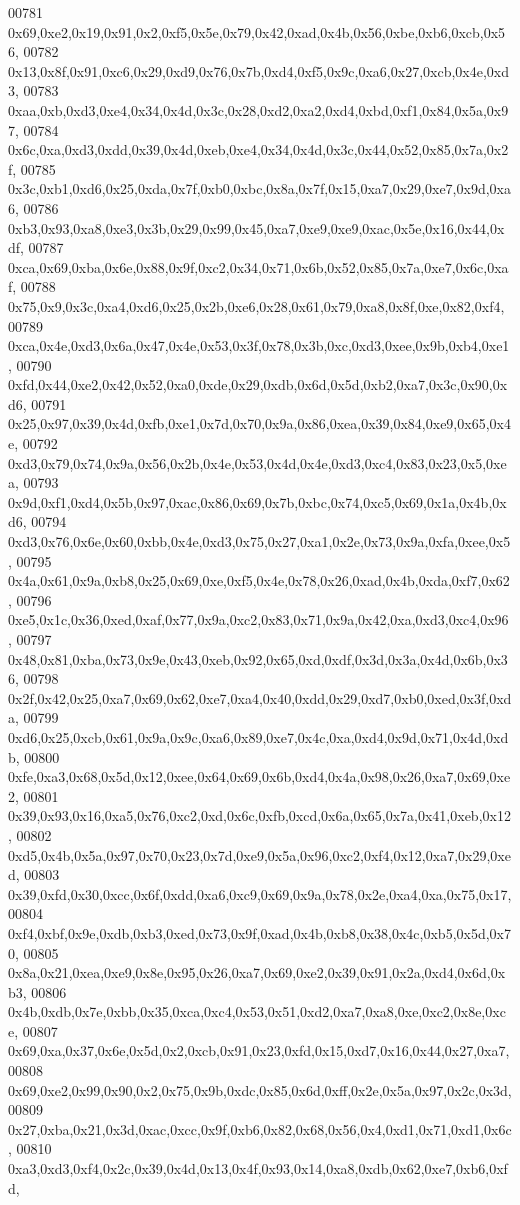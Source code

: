 \begin{DoxyCode}
00781   0x69,0xe2,0x19,0x91,0x2,0xf5,0x5e,0x79,0x42,0xad,0x4b,0x56,0xbe,0xb6,0xcb,0x56,
00782   0x13,0x8f,0x91,0xc6,0x29,0xd9,0x76,0x7b,0xd4,0xf5,0x9c,0xa6,0x27,0xcb,0x4e,0xd3,
00783   0xaa,0xb,0xd3,0xe4,0x34,0x4d,0x3c,0x28,0xd2,0xa2,0xd4,0xbd,0xf1,0x84,0x5a,0x97,
00784   0x6c,0xa,0xd3,0xdd,0x39,0x4d,0xeb,0xe4,0x34,0x4d,0x3c,0x44,0x52,0x85,0x7a,0x2f,
00785   0x3c,0xb1,0xd6,0x25,0xda,0x7f,0xb0,0xbc,0x8a,0x7f,0x15,0xa7,0x29,0xe7,0x9d,0xa6,
00786   0xb3,0x93,0xa8,0xe3,0x3b,0x29,0x99,0x45,0xa7,0xe9,0xe9,0xac,0x5e,0x16,0x44,0xdf,
00787   0xca,0x69,0xba,0x6e,0x88,0x9f,0xc2,0x34,0x71,0x6b,0x52,0x85,0x7a,0xe7,0x6c,0xaf,
00788   0x75,0x9,0x3c,0xa4,0xd6,0x25,0x2b,0xe6,0x28,0x61,0x79,0xa8,0x8f,0xe,0x82,0xf4,
00789   0xca,0x4e,0xd3,0x6a,0x47,0x4e,0x53,0x3f,0x78,0x3b,0xc,0xd3,0xee,0x9b,0xb4,0xe1,
00790   0xfd,0x44,0xe2,0x42,0x52,0xa0,0xde,0x29,0xdb,0x6d,0x5d,0xb2,0xa7,0x3c,0x90,0xd6,
00791   0x25,0x97,0x39,0x4d,0xfb,0xe1,0x7d,0x70,0x9a,0x86,0xea,0x39,0x84,0xe9,0x65,0x4e,
00792   0xd3,0x79,0x74,0x9a,0x56,0x2b,0x4e,0x53,0x4d,0x4e,0xd3,0xc4,0x83,0x23,0x5,0xea,
00793   0x9d,0xf1,0xd4,0x5b,0x97,0xac,0x86,0x69,0x7b,0xbc,0x74,0xc5,0x69,0x1a,0x4b,0xd6,
00794   0xd3,0x76,0x6e,0x60,0xbb,0x4e,0xd3,0x75,0x27,0xa1,0x2e,0x73,0x9a,0xfa,0xee,0x5,
00795   0x4a,0x61,0x9a,0xb8,0x25,0x69,0xe,0xf5,0x4e,0x78,0x26,0xad,0x4b,0xda,0xf7,0x62,
00796   0xe5,0x1c,0x36,0xed,0xaf,0x77,0x9a,0xc2,0x83,0x71,0x9a,0x42,0xa,0xd3,0xc4,0x96,
00797   0x48,0x81,0xba,0x73,0x9e,0x43,0xeb,0x92,0x65,0xd,0xdf,0x3d,0x3a,0x4d,0x6b,0x36,
00798   0x2f,0x42,0x25,0xa7,0x69,0x62,0xe7,0xa4,0x40,0xdd,0x29,0xd7,0xb0,0xed,0x3f,0xda,
00799   0xd6,0x25,0xcb,0x61,0x9a,0x9c,0xa6,0x89,0xe7,0x4c,0xa,0xd4,0x9d,0x71,0x4d,0xdb,
00800   0xfe,0xa3,0x68,0x5d,0x12,0xee,0x64,0x69,0x6b,0xd4,0x4a,0x98,0x26,0xa7,0x69,0xe2,
00801   0x39,0x93,0x16,0xa5,0x76,0xc2,0xd,0x6c,0xfb,0xcd,0x6a,0x65,0x7a,0x41,0xeb,0x12,
00802   0xd5,0x4b,0x5a,0x97,0x70,0x23,0x7d,0xe9,0x5a,0x96,0xc2,0xf4,0x12,0xa7,0x29,0xed,
00803   0x39,0xfd,0x30,0xcc,0x6f,0xdd,0xa6,0xc9,0x69,0x9a,0x78,0x2e,0xa4,0xa,0x75,0x17,
00804   0xf4,0xbf,0x9e,0xdb,0xb3,0xed,0x73,0x9f,0xad,0x4b,0xb8,0x38,0x4c,0xb5,0x5d,0x70,
00805   0x8a,0x21,0xea,0xe9,0x8e,0x95,0x26,0xa7,0x69,0xe2,0x39,0x91,0x2a,0xd4,0x6d,0xb3,
00806   0x4b,0xdb,0x7e,0xbb,0x35,0xca,0xc4,0x53,0x51,0xd2,0xa7,0xa8,0xe,0xc2,0x8e,0xce,
00807   0x69,0xa,0x37,0x6e,0x5d,0x2,0xcb,0x91,0x23,0xfd,0x15,0xd7,0x16,0x44,0x27,0xa7,
00808   0x69,0xe2,0x99,0x90,0x2,0x75,0x9b,0xdc,0x85,0x6d,0xff,0x2e,0x5a,0x97,0x2c,0x3d,
00809   0x27,0xba,0x21,0x3d,0xac,0xcc,0x9f,0xb6,0x82,0x68,0x56,0x4,0xd1,0x71,0xd1,0x6c,
00810   0xa3,0xd3,0xf4,0x2c,0x39,0x4d,0x13,0x4f,0x93,0x14,0xa8,0xdb,0x62,0xe7,0xb6,0xfd,

\end{DoxyCode}
